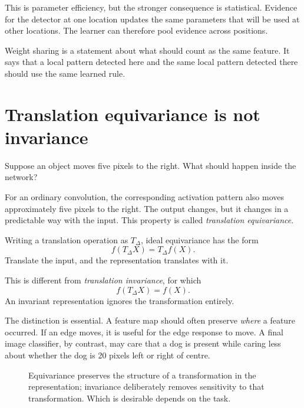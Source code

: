 This is parameter efficiency, but the stronger consequence is statistical. Evidence for the detector at one location updates the same parameters that will be used at other locations. The learner can therefore pool evidence across positions.

\begin{keyidea}
Weight sharing is a statement about what should count as the same feature. It says that a local pattern detected here and the same local pattern detected there should use the same learned rule.
\end{keyidea}

\section{Translation equivariance is not invariance}

Suppose an object moves five pixels to the right. What should happen inside the network?

For an ordinary convolution, the corresponding activation pattern also moves approximately five pixels to the right. The output changes, but it changes in a predictable way with the input. This property is called \emph{translation equivariance}.

Writing a translation operation as \(T_\Delta\), ideal equivariance has the form
\[
  f(T_\Delta X) = T_\Delta f(X).
\]
Translate the input, and the representation translates with it.

This is different from \emph{translation invariance}, for which
\[
  f(T_\Delta X) = f(X).
\]
An invariant representation ignores the transformation entirely.

The distinction is essential. A feature map should often preserve \emph{where} a feature occurred. If an edge moves, it is useful for the edge response to move. A final image classifier, by contrast, may care that a dog is present while caring less about whether the dog is 20 pixels left or right of centre.

\begin{figure}[ht]
  \caption{Equivariance preserves the structure of a transformation in the representation; invariance deliberately removes sensitivity to that transformation. Which is desirable depends on the task.}
  \label{fig:week5-equivariance}
\end{figure}


